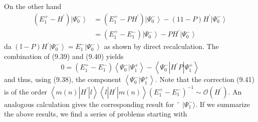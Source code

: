 On the other hand
\begin{equation}
\begin{aligned}\left(E_{1}^{+}-H^{\prime}\right)\left|\Psi_{0}^{-}\right\rangle &=\left(E_{1}^{+}-P H^{\prime}\right)\left|\Psi_{0}^{-}\right\rangle-(11-P) H^{\prime}\left|\Psi_{0}^{-}\right\rangle \\ &=\left(E_{1}^{+}-E_{1}^{-}\right)\left|\Psi_{0}^{-}\right\rangle- P H^{\prime}\left|\Psi_{0}^{-}\right\rangle \end{aligned}
\end{equation}
da $(\mathbb{I}-P) H^{\prime}\left|\Psi_{0}^{-}\right\rangle= E_{1}^{-}\left|\Psi_{0}^{-}\right\rangle$ as shown by direct recalculation. The combination of (9.39) and (9.40) yields
\begin{equation}
    0=\left(E_{1}^{+}-E_{1}^{-}\right)\left\langle\Psi_{0}^{-} | \Psi_{1}^{+}\right\rangle-\left\langle\Psi_{0}^{-}\left|H^{\prime} P\right| \Psi_{1}^{+}\right\rangle
    \end{equation}
and thus, using (9.38), the component $\left\langle\Psi_{0}^{-} | \Psi_{1}^{+}\right\rangle$. Note that the correction (9.41) is of the order $\left\langle m(n)\left|H^{\prime}\right| l\right\rangle\left\langle l\left|H^{\prime}\right| m(n)\right\rangle\left(E_{1}^{+}-E_{1}^{-}\right)^{-1} \sim \mathcal{O}\left(H^{\prime}\right)$. An analogous calculation gives the corresponding result for ¨ $|\Psi_1^{-}\rangle$. If we summarize the above results, we find a series of problems starting with
